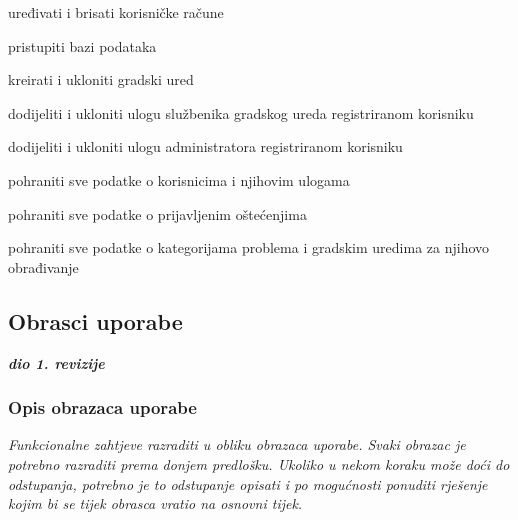 \begin{packed_enum}
	\begin{packed_enum}

		\item uređivati i brisati korisničke račune
		\item pristupiti bazi podataka
		\item kreirati i ukloniti gradski ured
		\item dodijeliti i ukloniti ulogu službenika gradskog ureda registriranom korisniku 
		\item dodijeliti i ukloniti ulogu administratora registriranom korisniku 
	\end{packed_enum}

	\item {}

	\begin{packed_enum}

		\item pohraniti sve podatke o korisnicima i njihovim ulogama
		\item pohraniti sve podatke o prijavljenim oštećenjima
		\item pohraniti sve podatke o kategorijama problema i gradskim uredima za njihovo obrađivanje

	\end{packed_enum}

\end{packed_enum}


\eject



\subsection{Obrasci uporabe}

\textbf{\textit{dio 1. revizije}}

\subsubsection{Opis obrazaca uporabe}
\textit{Funkcionalne zahtjeve razraditi u obliku obrazaca uporabe. Svaki obrazac je potrebno razraditi prema donjem predlošku. Ukoliko u nekom koraku može doći do odstupanja, potrebno je to odstupanje opisati i po mogućnosti ponuditi rješenje kojim bi se tijek obrasca vratio na osnovni tijek.}\\


